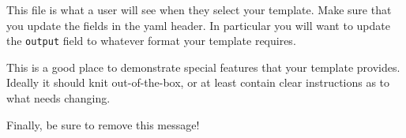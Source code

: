 \documentclass[11pt]{article}
\begin{document}
This file is what a user will see when they select your template. Make
sure that you update the fields in the yaml header. In particular you
will want to update the \texttt{output} field to whatever format your
template requires.

This is a good place to demonstrate special features that your template
provides. Ideally it should knit out-of-the-box, or at least contain
clear instructions as to what needs changing.

Finally, be sure to remove this message!

% 
% 

\newpage
\appendix
%


%
%


\end{document}
